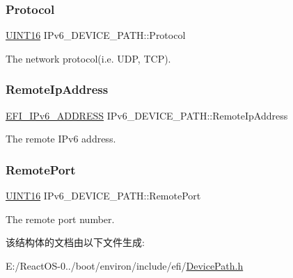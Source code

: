 \subsubsection{\texorpdfstring{Protocol}{Protocol}}
{\footnotesize\ttfamily \hyperlink{_processor_bind_8h_a09f1a1fb2293e33483cc8d44aefb1eb1}{U\+I\+N\+T16} I\+Pv6\+\_\+\+D\+E\+V\+I\+C\+E\+\_\+\+P\+A\+T\+H\+::\+Protocol}

The network protocol(i.\+e. U\+DP, T\+CP). \mbox{\label{struct_i_pv6___d_e_v_i_c_e___p_a_t_h_acc51a89b32c647798bef772914626f27}} 
\subsubsection{\texorpdfstring{Remote\+Ip\+Address}{RemoteIpAddress}}
{\footnotesize\ttfamily \hyperlink{struct_e_f_i___i_pv6___a_d_d_r_e_s_s}{E\+F\+I\+\_\+\+I\+Pv6\+\_\+\+A\+D\+D\+R\+E\+SS} I\+Pv6\+\_\+\+D\+E\+V\+I\+C\+E\+\_\+\+P\+A\+T\+H\+::\+Remote\+Ip\+Address}

The remote I\+Pv6 address. \mbox{\label{struct_i_pv6___d_e_v_i_c_e___p_a_t_h_a9e468362588a0c2cf78f97f136fefe82}} 
\subsubsection{\texorpdfstring{Remote\+Port}{RemotePort}}
{\footnotesize\ttfamily \hyperlink{_processor_bind_8h_a09f1a1fb2293e33483cc8d44aefb1eb1}{U\+I\+N\+T16} I\+Pv6\+\_\+\+D\+E\+V\+I\+C\+E\+\_\+\+P\+A\+T\+H\+::\+Remote\+Port}

The remote port number. 

该结构体的文档由以下文件生成\+:\begin{DoxyCompactItemize}
\item 
E\+:/\+React\+O\+S-\/0../boot/environ/include/efi/\hyperlink{_device_path_8h}{Device\+Path.\+h}\end{DoxyCompactItemize}
